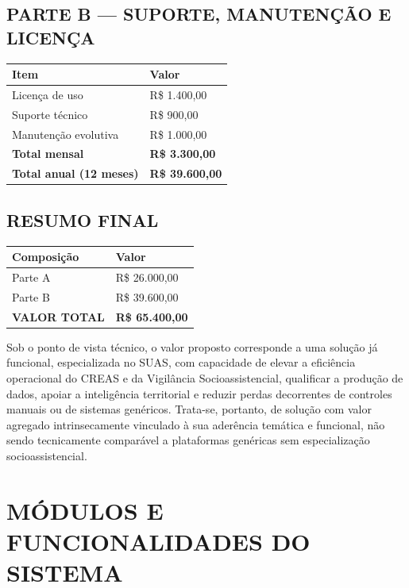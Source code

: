 \documentclass[12pt,a4paper]{article}
\begin{document}
\subsection*{PARTE B --- SUPORTE, MANUTENÇÃO E LICENÇA}

\begin{center}
\begin{tabularx}{\textwidth}{Y>{\raggedleft\arraybackslash}p{4cm}}
\toprule
\textbf{Item} & \textbf{Valor} \\
\midrule
Licença de uso & R\$ 1.400,00 \\
Suporte técnico & R\$ 900,00 \\
Manutenção evolutiva & R\$ 1.000,00 \\
\textbf{Total mensal} & \textbf{R\$ 3.300,00} \\
\textbf{Total anual (12 meses)} & \textbf{R\$ 39.600,00} \\
\bottomrule
\end{tabularx}
\end{center}

\subsection*{RESUMO FINAL}

\begin{center}
\begin{tabularx}{\textwidth}{Y>{\raggedleft\arraybackslash}p{4cm}}
\toprule
\textbf{Composição} & \textbf{Valor} \\
\midrule
Parte A & R\$ 26.000,00 \\
Parte B & R\$ 39.600,00 \\
\textbf{VALOR TOTAL} & \textbf{R\$ 65.400,00} \\
\bottomrule
\end{tabularx}
\end{center}

Sob o ponto de vista técnico, o valor proposto corresponde a uma solução já funcional, especializada no SUAS, com capacidade de elevar a eficiência operacional do CREAS e da Vigilância Socioassistencial, qualificar a produção de dados, apoiar a inteligência territorial e reduzir perdas decorrentes de controles manuais ou de sistemas genéricos. Trata-se, portanto, de solução com valor agregado intrinsecamente vinculado à sua aderência temática e funcional, não sendo tecnicamente comparável a plataformas genéricas sem especialização socioassistencial.

\section{MÓDULOS E FUNCIONALIDADES DO SISTEMA}
\end{document}
